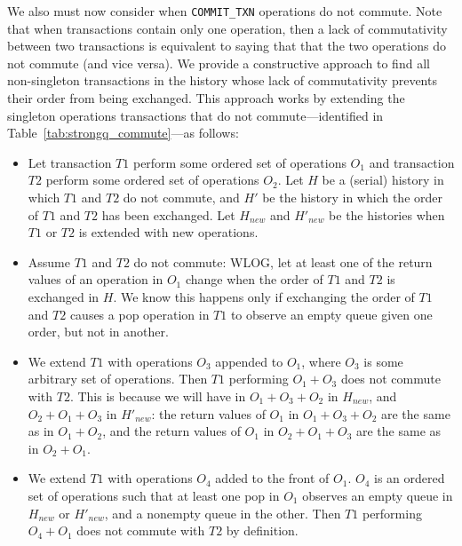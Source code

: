 We also must now consider when \texttt{COMMIT\_TXN} operations do not commute. Note that when transactions contain only one operation, then a lack of commutativity between two transactions is equivalent to saying that that the two operations do not commute (and vice versa). We provide a constructive approach to find all non-singleton transactions in the history whose lack of commutativity prevents their order from being exchanged. This approach works by extending the singleton operations transactions that do not commute---identified in Table~\ref{tab:strongq_commute}---as follows: 
\begin{itemize}
    \item Let transaction $T1$ perform some ordered set of operations $O_1$ and transaction $T2$ perform some ordered set of operations $O_2$. Let $H$ be a (serial) history in which $T1$ and $T2$ do not commute, and $H'$ be the history in which the order of $T1$ and $T2$ has been exchanged. Let $H_{new}$ and $H'_{new}$ be the histories when $T1$ or $T2$ is extended with new operations.
    \item Assume $T1$ and $T2$ do not commute: WLOG, let at least one of the return values of an operation in $O_1$ change when the order of $T1$ and $T2$ is exchanged in $H$. We know this happens only if exchanging the order of $T1$ and $T2$ causes a pop operation in $T1$ to observe an empty queue given one order, but not in another.
    \item We extend $T1$ with operations $O_3$ appended to $O_1$, where $O_3$ is some arbitrary set of operations. Then $T1$ performing $O_1 + O_3$ does not commute with $T2$. This is because we will have in $O_1 + O_3 + O_2$ in $H_{new}$, and $O_2 + O_1 + O_3$ in $H'_{new}$: the return values of $O_1$ in $O_1 + O_3 + O_2$ are the same as in $O_1 + O_2$, and the return values of $O_1$ in $O_2 + O_1 + O_3$ are the same as in $O_2 + O_1$.
    \item We extend $T1$ with operations $O_4$ added to the front of $O_1$. $O_4$ is an ordered set of operations such that at least one pop in $O_1$ observes an empty queue in $H_{new}$ or $H'_{new}$, and a nonempty queue in the other. Then $T1$ performing $O_4 + O_1$ does not commute with $T2$ by definition.
\end{itemize}

